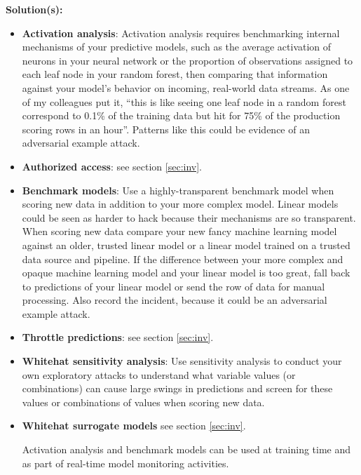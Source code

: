 \documentclass[fleqn]{article}
\begin{document}
\noindent\textbf{Solution(s):} 
\begin{itemize}

\item \textbf{Activation analysis}: Activation analysis requires benchmarking internal mechanisms of your predictive models, such as the average activation of neurons in your neural network or the proportion of observations assigned to each leaf node in your random forest, then comparing that information against your model's behavior on incoming, real-world data streams. As one of my colleagues put it, ``this is like seeing one leaf node in a random forest correspond to 0.1\% of the training data but hit for 75\% of the production scoring rows in an hour''. Patterns like this could be evidence of an adversarial example attack.

\item \textbf{Authorized access}: see section \ref{sec:inv}.

\item \textbf{Benchmark models}: Use a highly-transparent benchmark model when scoring new data in addition to your more complex model. Linear models could be seen as harder to hack because their mechanisms are so transparent. When scoring new data compare your new fancy machine learning model against an older, trusted linear model or a linear model trained on a trusted data source and pipeline. If the difference between your more complex and opaque machine learning model and your linear model is too great, fall back to predictions of your linear model or send the row of data for manual processing. Also record the incident, because it could be an adversarial example attack.

\item \textbf{Throttle predictions}: see section \ref{sec:inv}.

\item \textbf{Whitehat sensitivity analysis}: Use sensitivity analysis to conduct your own exploratory attacks to understand what variable values (or combinations) can cause large swings in predictions and screen for these values or combinations of values when scoring new data.

\item \textbf{Whitehat surrogate models} see section \ref{sec:inv}.

\noindent Activation analysis and benchmark models can be used at training time and as part of real-time model monitoring activities.

\end{itemize}
\end{document}
